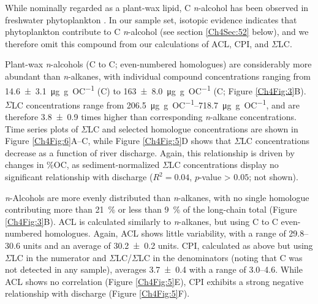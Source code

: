While nominally regarded as a plant-wax lipid, C \textit{n}-alcohol has been observed in freshwater phytoplankton \citep{Volkman:1998tk,Volkman:1999tq,Xu:2007jk}. In our sample set, isotopic evidence indicates that phytoplankton contribute to C \textit{n}-alcohol (see section \ref{Ch4Sec:52} below), and we therefore omit this compound from our calculations of ACL, CPI, and $\Sigma$LC. 

Plant-wax \textit{n}-alcohols (C to C; even-numbered homologues) are considerably more abundant than \textit{n}-alkanes, with individual compound concentrations ranging from \SI{14.6 \pm 3.1}{\micro g.g.OC^{-1}} (C) to \SI{163 \pm 8.0}{\micro g.g.OC^{-1}} (C; Figure \ref{Ch4Fig:3}B). $\Sigma$LC concentrations range from \SIrange{206.5}{718.7}{\micro g.g.OC^{-1}}, and are therefore \num{3.8 \pm 0.9} times higher than corresponding \textit{n}-alkane concentrations. Time series plots of $\Sigma$LC and selected homologue concentrations are shown in Figure \ref{Ch4Fig:6}A--C, while Figure \ref{Ch4Fig:5}D shows that $\Sigma$LC concentrations decrease as a function of river discharge. Again, this relationship is driven by changes in \%OC, as sediment-normalized $\Sigma$LC concentrations display no significant relationship with discharge ($R^2 = 0.04$, $p$-value > $0.05$; not shown).

\textit{n}-Alcohols are more evenly distributed than \textit{n}-alkanes, with no single homologue contributing more than \SI{21}{\%} or less than \SI{9}{\%} of the long-chain total (Figure \ref{Ch4Fig:3}B). ACL is calculated similarly to \textit{n}-alkanes, but using C to C even-numbered homologues. Again, ACL shows little variability, with a range of \numrange{29.8}{30.6} units and an average of \num{30.2 \pm 0.2} units. CPI, calculated as above but using $\Sigma$LC in the numerator and $\Sigma$LC/$\Sigma$LC in the denominators (noting that C was not detected in any sample), averages \num{3.7 \pm 0.4} with a range of \numrange{3.0}{4.6}. While ACL shows no correlation (Figure \ref{Ch4Fig:5}E), CPI exhibits a strong negative relationship with discharge (Figure \ref{Ch4Fig:5}F).

